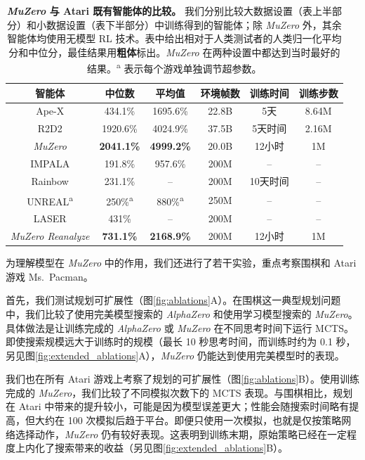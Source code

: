 \documentclass{article}
\newcommand{\muzero}{\emph{MuZero}}
\newcommand{\reanalyze}{\emph{MuZero Reanalyze}}
\newcommand{\alphazero}{\emph{AlphaZero}}
\begin{document}
\begin{table}

\begin{tabularx}{\textwidth}{c c c c c c}

\toprule
智能体&中位数&平均值&环境帧数&训练时间&训练步数\\
\midrule
Ape-X\cite{apex} & 434.1\% & 1695.6\% & 22.8B &5天& 8.64M\\
R2D2 \cite{r2d2} & 1920.6\% & 4024.9\% & 37.5B &5天时间& 2.16M \\
\muzero{} & \textbf{2041.1\%} & \textbf{4999.2\%} & 20.0B &12小时& 1M \\
\midrule
IMPALA\cite{impala} & 191.8\% & 957.6\% & 200M & -- & -- \\
Rainbow \cite{rainbow} & 231.1\% & -- & 200M &10天时间& -- \\
UNREAL\textsuperscript{a} \cite{unreal} & 250\%\textsuperscript{a} & 880\%\textsuperscript{a} & 250M & -- & -- \\
LASER\cite{laser} & 431\% & -- & 200M & -- & -- \\
\reanalyze{} & \textbf{731.1\%} & \textbf{2168.9\%} & 200M &12小时& 1M \\
\bottomrule
\end{tabularx}

\caption{\label{tab:atari-comparison}
\textbf{\muzero{} 与 Atari 既有智能体的比较。} 我们分别比较大数据设置（表上半部分）和小数据设置（表下半部分）中训练得到的智能体；除 \muzero{} 外，其余智能体均使用无模型 RL 技术。表中给出相对于人类测试者的人类归一化平均分和中位分，最佳结果用\textbf{粗体}标出。\muzero{} 在两种设置中都达到当时最好的结果。\textsuperscript{a} 表示每个游戏单独调节超参数。}
\end{table}

为理解模型在 \muzero{} 中的作用，我们还进行了若干实验，重点考察围棋和 Atari 游戏 Ms.~Pacman。

首先，我们测试规划可扩展性（图\ref{fig:ablations}A）。在围棋这一典型规划问题中，我们比较了使用完美模型搜索的 \alphazero{} 和使用学习模型搜索的 \muzero{}。具体做法是让训练完成的 \alphazero{} 或 \muzero{} 在不同思考时间下运行 MCTS。即使搜索规模远大于训练时的规模（最长 10 秒思考时间，而训练时约为 0.1 秒，另见图\ref{fig:extended_ablations}A），\muzero{} 仍能达到使用完美模型时的表现。

我们也在所有 Atari 游戏上考察了规划的可扩展性（图\ref{fig:ablations}B）。使用训练完成的 \muzero{}，我们比较了不同模拟次数下的 MCTS 表现。与围棋相比，规划在 Atari 中带来的提升较小，可能是因为模型误差更大；性能会随搜索时间略有提高，但大约在 100 次模拟后趋于平台。即便只使用一次模拟，也就是仅按策略网络选择动作，\muzero{} 仍有较好表现。这表明到训练末期，原始策略已经在一定程度上内化了搜索带来的收益（另见图\ref{fig:extended_ablations}B）。
\end{document}
